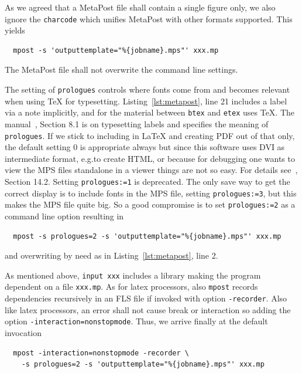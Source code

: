 As we agreed that a MetaPost file shall contain a single figure only, 
we also ignore the \texttt{charcode} which unifies MetaPost with other formats supported. 
This yields 
%
\begin{verbatim}
  mpost -s 'outputtemplate="%{jobname}.mps"' xxx.mp
\end{verbatim}
%
The MetaPost file shall not overwrite the command line settings. 

The setting of \texttt{prologues} controls where fonts come from and 
becomes relevant when using \TeX{} for typesetting. 
Listing~\ref{lst:metapost}, line 21 includes a label via a note implicitly, 
and for the material between \texttt{btex} and \texttt{etex} uses \TeX{}. 
The manual~\cite{MPost}, Section 8.1 is on typesetting labels 
and specifies the meaning of \texttt{prologues}. 
If we stick to including in \LaTeX{} and creating PDF out of that only, 
the default setting $0$ is appropriate always 
but since this software uses DVI as intermediate format, e.g.\@ to create HTML, 
or because for debugging one wants to view the MPS files standalone in a viewer 
things are not so easy. 
For details see~\cite{MPost}, Section 14.2. 
Setting \texttt{prologues:=1} is deprecated. 
The only save way to get the correct display is to include fonts in the MPS file, 
setting \texttt{prologues:=3}, but this makes the MPS file quite big. 
So a good compromise is to set \texttt{prologues:=2} as a command line option 
resulting in 
%
\begin{verbatim}
  mpost -s prologues=2 -s 'outputtemplate="%{jobname}.mps"' xxx.mp
\end{verbatim}
%
and overwriting by need as in Listing~\ref{lst:metapost}, line 2. 

As mentioned above, \texttt{input xxx} includes a library 
making the program dependent on a file \texttt{xxx.mp}. 
As for latex processors, also \texttt{mpost} records dependencies recursively 
in an FLS file if invoked with option \texttt{-recorder}. 
Also like latex processors, an error shall not cause break or interaction 
so adding the option \texttt{-interaction=nonstopmode}. 
Thus, we arrive finally at the default invocation 
%
\begin{verbatim}
  mpost -interaction=nonstopmode -recorder \
    -s prologues=2 -s 'outputtemplate="%{jobname}.mps"' xxx.mp
\end{verbatim}











